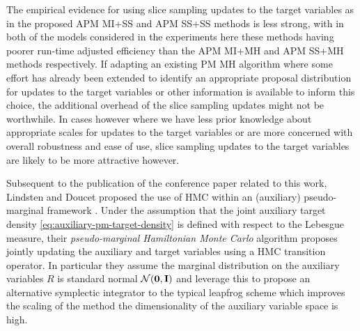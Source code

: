 The empirical evidence for using slice sampling updates to the target variables as in the proposed \ac{APM} \ac{MI}+\ac{SS} and \ac{APM} \ac{SS}+\ac{SS} methods is less strong, with in both of the models considered in the experiments here these methods having poorer run-time adjusted efficiency than the \ac{APM} \ac{MI}+\ac{MH} and \ac{APM} \ac{SS}+\ac{MH} methods respectively. If adapting an existing \ac{PM} \ac{MH} algorithm where some effort has already been extended to identify an appropriate proposal distribution for updates to the target variables or other information is available to inform this choice, the additional overhead of the slice sampling updates might not be worthwhile. In cases however where we have less prior knowledge about appropriate scales for updates to the target variables or are more concerned with overall robustness and ease of use, slice sampling updates to the target variables are likely to be more attractive however.

Subsequent to the publication of the conference paper related to this work, Lindsten and Doucet proposed the use of \ac{HMC} within an (auxiliary) pseudo-marginal framework \citep{lindsten2016pseudo}. Under the assumption that the joint auxiliary target density \eqref{eq:auxiliary-pm-target-density} is defined with respect to the Lebesgue measure, their \emph{pseudo-marginal Hamiltonian Monte Carlo} algorithm proposes jointly updating the auxiliary and target variables using a \ac{HMC} transition operator. In particular they assume the marginal distribution on the auxiliary variables $R$ is standard normal $\nrm{\vct{0},\idmtx}$ and leverage this to propose an alternative symplectic integrator to the typical leapfrog scheme which improves the scaling of the method the dimensionality of the auxiliary variable space is high. 

